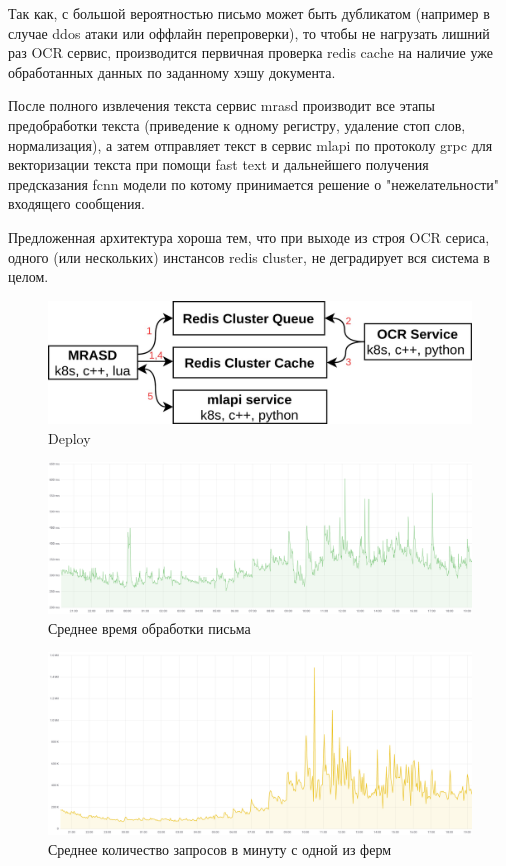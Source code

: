 \documentclass[12pt]{article}
\begin{document}
Так как, с большой вероятностью письмо может быть дубликатом (например в случае ddos атаки или оффлайн перепроверки), то чтобы не нагрузать лишний раз OCR сервис, производится первичная проверка redis cache на наличие уже обработанных данных по заданному хэшу документа.

После полного извлечения текста сервис mrasd производит все этапы предобработки текста (приведение к одному регистру, удаление стоп слов, нормализация), а затем отправляет текст в сервис mlapi по протоколу grpc для векторизации текста при помощи fast text и дальнейшего получения предсказания fcnn модели по котому принимается решение о "нежелательности"  входящего сообщения.

Предложенная архитектура хороша тем, что при выходе из строя OCR сериса, одного (или нескольких) инстансов redis сluster, не деградирует вся система в целом.
 
\begin{figure}[h!]
	\center
	\includegraphics[scale=0.25]{deploy.jpg}
	\caption{Deploy}
	\label{fig:02}
\end{figure}


\begin{figure}[h!]
	\center
	\includegraphics[scale=0.25]{timings.png}
	\caption{Среднее время обработки письма}
	\label{fig:03}
\end{figure}


\begin{figure}[h!]
	\center
	\includegraphics[scale=0.25]{processed_messages.png}
	\caption{Среднее количество запросов в минуту с одной из ферм}
	\label{fig:04}
\end{figure}
\end{document}
